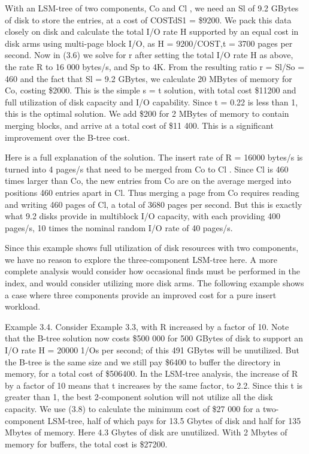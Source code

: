 \documentclass[a4paper,11pt,notitlepage,twoside,openright]{article}
\begin{document}
With an LSM-tree of two components, Co and Cl , we need an Sl of 9.2
GBytes of disk to store the entries, at a cost of COSTdS1 = \$9200. We
pack this data closely on disk and calculate the total I/O rate H
supported by an equal cost in disk arms using multi-page block I/O, as H
= 9200/COST,t = 3700 pages per second. Now in (3.6) we solve for r after
setting the total I/O rate H as above, the rate R to 16 000 bytes/s, and
Sp to 4K. From the resulting ratio r = Sl/So = 460 and the fact that Sl
= 9.2 GBytes, we calculate 20 MBytes of memory for Co, costing \$2000.
This is the simple s = t solution, with total cost \$11200 and full
utilization of disk capacity and I/O capability. Since t = 0.22 is less
than 1, this is the optimal solution. We add \$200 for 2 MBytes of
memory to contain merging blocks, and arrive at a total cost of \$11
400. This is a significant improvement over the B-tree cost.

Here is a full explanation of the solution. The insert rate of R = 16000
bytes/s is turned into 4 pages/s that need to be merged from Co to Cl .
Since Cl is 460 times larger than Co, the new entries from Co are on the
average merged into positions 460 entries apart in Cl. Thus merging a
page from Co requires reading and writing 460 pages of Cl, a total of
3680 pages per second. But this is exactly what 9.2 disks provide in
multiblock I/O capacity, with each providing 400 pages/s, 10 times the
nominal random I/O rate of 40 pages/s.

Since this example shows full utilization of disk resources with two
components, we have no reason to explore the three-component LSM-tree
here. A more complete analysis would consider how occasional finds must
be performed in the index, and would consider utilizing more disk arms.
The following example shows a case where three components provide an
improved cost for a pure insert workload.

Example 3.4. Consider Example 3.3, with R increased by a factor of 10.
Note that the B-tree solution now costs \$500 000 for 500 GBytes of disk
to support an I/O rate H = 20000 1/Os per second; of this 491 GBytes
will be unutilized. But the B-tree is the same size and we still pay
\$6400 to buffer the directory in memory, for a total cost of \$506400.
In the LSM-tree analysis, the increase of R by a factor of 10 means that
t increases by the same factor, to 2.2. Since this t is greater than 1,
the best 2-component solution will not utilize all the disk capacity. We
use (3.8) to calculate the minimum cost of \$27 000 for a two-component
LSM-tree, half of which pays for 13.5 Gbytes of disk and half for 135
Mbytes of memory. Here 4.3 Gbytes of disk are unutilized. With 2 Mbytes
of memory for buffers, the total cost is \$27200.
\end{document}
